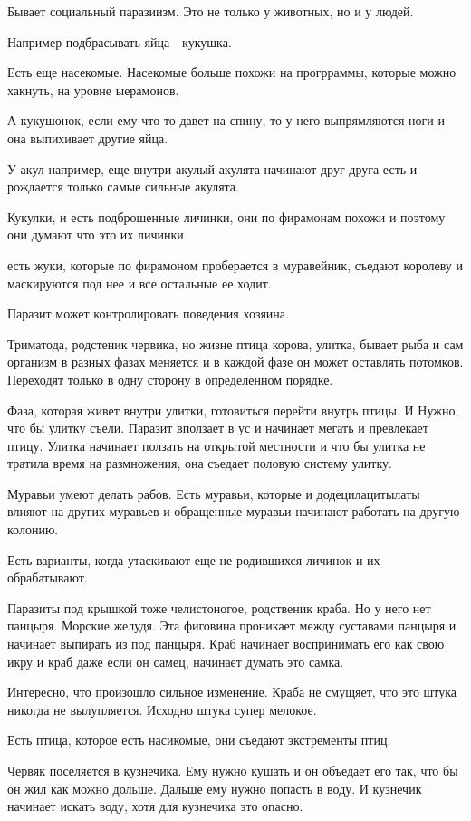 Бывает социальный паразиизм. Это не только 
у животных, но и у людей. 

Например подбрасывать яйца - кукушка. 

Есть еще насекомые. Насекомые больше похожи на прогрраммы, которые можно хакнуть, 
на уровне ыерамонов. 

А кукушонок, если ему что-то давет на спину, то у него выпрямляются ноги и она выпихивает
другие яйца.

У акул например, еще внутри акулый акулята начинают друг друга есть и
рождается только самые сильные акулята.

Кукулки, и есть подброшенные личинки, они по фирамонам похожи и поэтому
они думают что это их личинки

есть жуки, которые по фирамоном проберается в муравейник, съедают королеву и
маскируются под нее и все остальные ее ходит.


Паразит может контролировать поведения хозяина.

Триматода, родстеник червика,
но жизне  птица корова, улитка, бывает рыба и
сам организм в разных фазах меняется и
в каждой фазе он может оставлять потомков. Переходят
только в одну сторону в определенном порядке.

Фаза, которая живет внутри улитки, готовиться перейти внутрь птицы. И
Нужно, что бы улитку съели. Паразит вползает в ус и начинает
мегать и превлекает птицу. Улитка начинает ползать на открытой местности
и что бы улитка не тратила время на размножения, она съедает половую систему улитку.


Муравьи умеют делать рабов. Есть муравьи, которые
и додецилацитылаты влияют на других муравьев и
обращенные муравьи начинают работать на
другую колонию.

Есть варианты, когда утаскивают еще не родившихся личинок и
их обрабатывают.

Паразиты под крышкой тоже челистоногое, родственик краба. Но у него нет
панцыря. Морские желудя. Эта фиговина проникает
между суставами панцыря и начинает выпирать из под
панцыря. Краб начинает воспринимать его как свою икру и
краб даже если он самец, начинает думать это самка.

Интересно, что произошло сильное изменение. 
Краба не смущяет, что это штука никогда 
не вылупляется. Исходно штука супер мелокое. 

Есть птица, которое есть насикомые, 
они съедают экстременты птиц. 


Червяк поселяется в кузнечика. Ему нужно кушать и 
он объедает его так, что бы он жил как можно дольше. 
Дальше ему нужно попасть в воду. И кузнечик начинает 
искать воду, хотя для кузнечика это опасно. 

